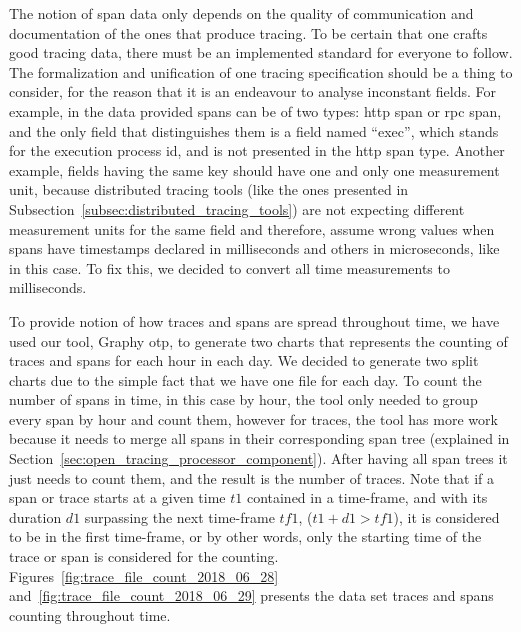 The notion of span data only depends on the quality of communication and documentation of the ones that produce tracing. To be certain that one crafts good tracing data, there must be an implemented standard for everyone to follow. The formalization and unification of one tracing specification should be a thing to consider, for the reason that it is an endeavour to analyse inconstant fields. For example, in the data provided spans can be of two types: \gls{http} span or \gls{rpc} span, and the only field that distinguishes them is a field named ``exec'', which stands for the execution process id, and is not presented in the \gls{http} span type. Another example, fields having the same key should have one and only one measurement unit, because distributed tracing tools (like the ones presented in Subsection~\ref{subsec:distributed_tracing_tools}) are not expecting different measurement units for the same field and therefore, assume wrong values when spans have timestamps declared in milliseconds and others in microseconds, like in this case. To fix this, we decided to convert all time measurements to milliseconds.

To provide notion of how traces and spans are spread throughout time, we have used our tool, Graphy \gls{otp}, to generate two charts that represents the counting of traces and spans for each hour in each day. We decided to generate two split charts due to the simple fact that we have one file for each day. To count the number of spans in time, in this case by hour, the tool only needed to group every span by hour and count them, however for traces, the tool has more work because it needs to merge all spans in their corresponding span tree (explained in Section~\ref{sec:open_tracing_processor_component}). After having all span trees it just needs to count them, and the result is the number of traces. Note that if a span or trace starts at a given time $t1$ contained in a time-frame, and with its duration $d1$ surpassing the next time-frame $tf1$, ($t1 + d1 > tf1$), it is considered to be in the first time-frame, or by other words, only the starting time of the trace or span is considered for the counting. Figures~\ref{fig:trace_file_count_2018_06_28} and~\ref{fig:trace_file_count_2018_06_29} presents the data set traces and spans counting throughout time.

